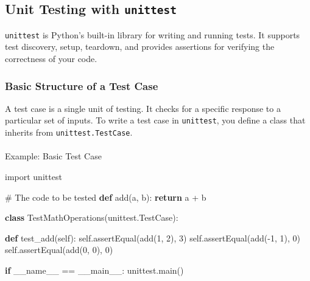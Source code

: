 \documentclass[
  letterpaper,
  DIV=11,
  numbers=noendperiod]{scrreprt}
\makeatletter
\let\oldparagraph\paragraph
\renewcommand{\paragraph}{
    \@ifstar
      \xxxParagraphStar
      \xxxParagraphNoStar
  }
\newcommand{\xxxParagraphStar}[1]{\oldparagraph*{#1}\mbox{}}
\newcommand{\xxxParagraphNoStar}[1]{\oldparagraph{#1}\mbox{}}
\newenvironment{Shaded}{\begin{snugshade}}{\end{snugshade}}
\newcommand{\CommentTok}[1]{\textcolor[rgb]{0.37,0.37,0.37}{#1}}
\newcommand{\ControlFlowTok}[1]{\textcolor[rgb]{0.00,0.23,0.31}{\textbf{#1}}}
\newcommand{\DecValTok}[1]{\textcolor[rgb]{0.68,0.00,0.00}{#1}}
\newcommand{\ImportTok}[1]{\textcolor[rgb]{0.00,0.46,0.62}{#1}}
\newcommand{\KeywordTok}[1]{\textcolor[rgb]{0.00,0.23,0.31}{\textbf{#1}}}
\newcommand{\NormalTok}[1]{\textcolor[rgb]{0.00,0.23,0.31}{#1}}
\newcommand{\OperatorTok}[1]{\textcolor[rgb]{0.37,0.37,0.37}{#1}}
\newcommand{\StringTok}[1]{\textcolor[rgb]{0.13,0.47,0.30}{#1}}
\newcommand{\VariableTok}[1]{\textcolor[rgb]{0.07,0.07,0.07}{#1}}
\makeatother
\begin{document}
\subsection{\texorpdfstring{Unit Testing with
\texttt{unittest}}{Unit Testing with unittest}}\label{unit-testing-with-unittest}

\texttt{unittest} is Python's built-in library for writing and running
tests. It supports test discovery, setup, teardown, and provides
assertions for verifying the correctness of your code.

\subsubsection{Basic Structure of a Test
Case}\label{basic-structure-of-a-test-case}

A test case is a single unit of testing. It checks for a specific
response to a particular set of inputs. To write a test case in
\texttt{unittest}, you define a class that inherits from
\texttt{unittest.TestCase}.

\paragraph{Example: Basic Test Case}\label{example-basic-test-case}

\begin{Shaded}
\begin{Highlighting}[]
\ImportTok{import}\NormalTok{ unittest}

\CommentTok{\# The code to be tested}
\KeywordTok{def}\NormalTok{ add(a, b):}
    \ControlFlowTok{return}\NormalTok{ a }\OperatorTok{+}\NormalTok{ b}

\KeywordTok{class}\NormalTok{ TestMathOperations(unittest.TestCase):}

    \KeywordTok{def}\NormalTok{ test\_add(}\VariableTok{self}\NormalTok{):}
        \VariableTok{self}\NormalTok{.assertEqual(add(}\DecValTok{1}\NormalTok{, }\DecValTok{2}\NormalTok{), }\DecValTok{3}\NormalTok{)}
        \VariableTok{self}\NormalTok{.assertEqual(add(}\OperatorTok{{-}}\DecValTok{1}\NormalTok{, }\DecValTok{1}\NormalTok{), }\DecValTok{0}\NormalTok{)}
        \VariableTok{self}\NormalTok{.assertEqual(add(}\DecValTok{0}\NormalTok{, }\DecValTok{0}\NormalTok{), }\DecValTok{0}\NormalTok{)}

\ControlFlowTok{if} \VariableTok{\_\_name\_\_} \OperatorTok{==} \StringTok{\textquotesingle{}\_\_main\_\_\textquotesingle{}}\NormalTok{:}
\NormalTok{    unittest.main()}
\end{Highlighting}
\end{Shaded}
\end{document}
